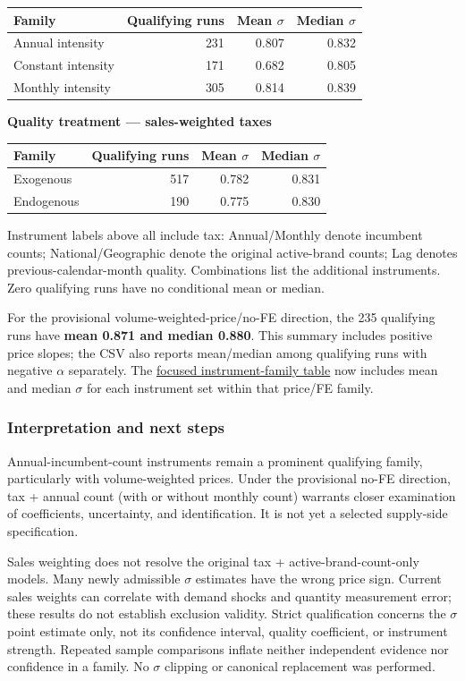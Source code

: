 \documentclass[10pt,]{article}
\begin{document}
\begin{longtable}[]{@{}lrrr@{}}
\toprule
Family & Qualifying runs & Mean \(\sigma\) & Median
\(\sigma\)\tabularnewline
\midrule
\endhead
Annual intensity & 231 & 0.807 & 0.832\tabularnewline
Constant intensity & 171 & 0.682 & 0.805\tabularnewline
Monthly intensity & 305 & 0.814 & 0.839\tabularnewline
\bottomrule
\end{longtable}

\textbf{Quality treatment --- sales-weighted taxes}

\begin{longtable}[]{@{}lrrr@{}}
\toprule
Family & Qualifying runs & Mean \(\sigma\) & Median
\(\sigma\)\tabularnewline
\midrule
\endhead
Exogenous & 517 & 0.782 & 0.831\tabularnewline
Endogenous & 190 & 0.775 & 0.830\tabularnewline
\bottomrule
\end{longtable}

Instrument labels above all include tax: Annual/Monthly denote incumbent
counts; National/Geographic denote the original active-brand counts; Lag
denotes previous-calendar-month quality. Combinations list the
additional instruments. Zero qualifying runs have no conditional mean or
median.

For the provisional volume-weighted-price/no-FE direction, the 235
qualifying runs have \textbf{mean 0.871 and median 0.880}. This summary
includes positive price slopes; the CSV also reports mean/median among
qualifying runs with negative \(\alpha\) separately. The
\href{tables/2026-10-27_sales_price_no_FE_instrument_families.csv}{focused
instrument-family table} now includes mean and median \(\sigma\) for
each instrument set within that price/FE family.

\subsubsection{Interpretation and next
steps}\label{interpretation-and-next-steps}

Annual-incumbent-count instruments remain a prominent qualifying family,
particularly with volume-weighted prices. Under the provisional no-FE
direction, tax + annual count (with or without monthly count) warrants
closer examination of coefficients, uncertainty, and identification. It
is not yet a selected supply-side specification.

Sales weighting does not resolve the original tax +
active-brand-count-only models. Many newly admissible \(\sigma\)
estimates have the wrong price sign. Current sales weights can correlate
with demand shocks and quantity measurement error; these results do not
establish exclusion validity. Strict qualification concerns the
\(\sigma\) point estimate only, not its confidence interval, quality
coefficient, or instrument strength. Repeated sample comparisons inflate
neither independent evidence nor confidence in a family. No \(\sigma\)
clipping or canonical replacement was performed.
\end{document}
